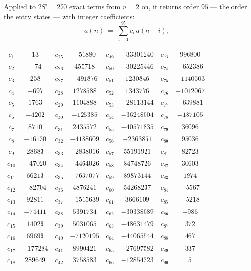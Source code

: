\documentclass[11pt,a4paper]{article}
\theoremstyle{plain}
\theoremstyle{definition}
\begin{document}
Applied to $2S'=220$ exact terms from $n=2$ on, it returns order $95$ --- the
order the entry states --- with integer coefficients:
\[
a(n)\;=\;\sum_{i=1}^{95}c_i\,a(n-i),
\]
\begin{center}\small
\begin{tabular}{cccccccc}
$c_{1}$ & $13$ & $c_{25}$ & $-51880$ & $c_{49}$ & $-33301240$ & $c_{73}$ & $996800$ \\
$c_{2}$ & $-74$ & $c_{26}$ & $455718$ & $c_{50}$ & $-30225446$ & $c_{74}$ & $-652386$ \\
$c_{3}$ & $258$ & $c_{27}$ & $-491876$ & $c_{51}$ & $1230846$ & $c_{75}$ & $-1140503$ \\
$c_{4}$ & $-697$ & $c_{28}$ & $1278588$ & $c_{52}$ & $1343776$ & $c_{76}$ & $-1012067$ \\
$c_{5}$ & $1763$ & $c_{29}$ & $1104888$ & $c_{53}$ & $-28113144$ & $c_{77}$ & $-639881$ \\
$c_{6}$ & $-4202$ & $c_{30}$ & $-125385$ & $c_{54}$ & $-36248004$ & $c_{78}$ & $-187105$ \\
$c_{7}$ & $8710$ & $c_{31}$ & $2435572$ & $c_{55}$ & $-40571835$ & $c_{79}$ & $36096$ \\
$c_{8}$ & $-16130$ & $c_{32}$ & $-4188609$ & $c_{56}$ & $-2363851$ & $c_{80}$ & $95036$ \\
$c_{9}$ & $28683$ & $c_{33}$ & $-2838016$ & $c_{57}$ & $55191921$ & $c_{81}$ & $82723$ \\
$c_{10}$ & $-47020$ & $c_{34}$ & $-4464026$ & $c_{58}$ & $84748726$ & $c_{82}$ & $30603$ \\
$c_{11}$ & $66213$ & $c_{35}$ & $-7637077$ & $c_{59}$ & $89873144$ & $c_{83}$ & $1974$ \\
$c_{12}$ & $-82704$ & $c_{36}$ & $4876241$ & $c_{60}$ & $54268237$ & $c_{84}$ & $-5567$ \\
$c_{13}$ & $92811$ & $c_{37}$ & $-1515639$ & $c_{61}$ & $3666109$ & $c_{85}$ & $-5218$ \\
$c_{14}$ & $-74411$ & $c_{38}$ & $5391734$ & $c_{62}$ & $-30338089$ & $c_{86}$ & $-986$ \\
$c_{15}$ & $14029$ & $c_{39}$ & $5031065$ & $c_{63}$ & $-48631479$ & $c_{87}$ & $372$ \\
$c_{16}$ & $69699$ & $c_{40}$ & $-7120195$ & $c_{64}$ & $-44065544$ & $c_{88}$ & $467$ \\
$c_{17}$ & $-177284$ & $c_{41}$ & $8990421$ & $c_{65}$ & $-27697582$ & $c_{89}$ & $337$ \\
$c_{18}$ & $289649$ & $c_{42}$ & $3758583$ & $c_{66}$ & $-12854323$ & $c_{90}$ & $5$ \\

\end{tabular}
\end{center}
\end{document}
